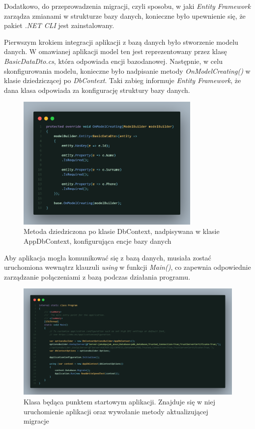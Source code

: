 \documentclass{report}
\begin{document}
Dodatkowo, do przeprowadzenia migracji, czyli sposobu, w jaki \textit{Entity Framework} zarządza zmianami w strukturze bazy danych, konieczne było upewnienie się, że pakiet \textit{.NET CLI} jest zainstalowany.

Pierwszym krokiem integracji aplikacji z bazą danych było stworzenie modelu danych. W omawianej aplikacji model ten jest reprezentowany przez klasę \textit{BasicDataDto.cs}, która odpowiada encji bazodanowej. Następnie, w celu skonfigurowania modelu, konieczne było nadpisanie metody \textit{OnModelCreating()} w klasie dziedziczącej po \textit{DbContext}. Taki zabieg informuje \textit{Entity Framework}, że dana klasa odpowiada za konfigurację struktury bazy danych.

\begin{figure}[H]
    \centering
    \includegraphics[width=0.8\textwidth]{src/app_dbcontext.png}
    \caption{Metoda dziedziczona po klasie DbContext, nadpisywana w klasie AppDbContext, konfigurująca encje bazy danych}
\end{figure}

Aby aplikacja mogła komunikować się z bazą danych, musiała zostać uruchomiona wewnątrz klauzuli \textit{using} w funkcji \textit{Main()}, co zapewnia odpowiednie zarządzanie połączeniami z bazą podczas działania programu.

\begin{figure}[H]
    \centering
    \includegraphics[width=1.0\textwidth]{src/main.png}
    \caption{Klasa będąca punktem startowym aplikacji. Znajduje się w niej uruchomienie aplikacji oraz wywołanie metody aktualizującej migracje}
\end{figure}
\end{document}
